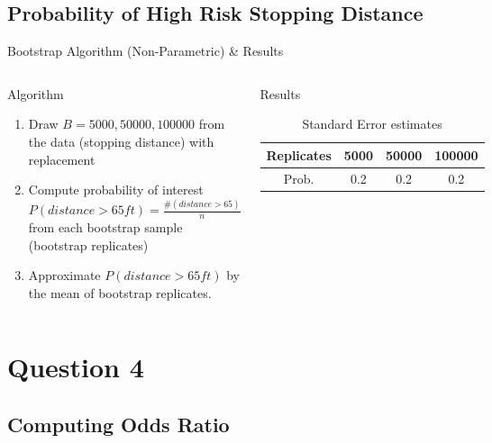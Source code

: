 \documentclass[a4paper,9pt]{beamer}\usepackage[]{graphicx}\usepackage[]{color}
\begin{document}
\subsection{Probability of High Risk Stopping Distance}
\begin{frame}{Bootstrap Algorithm (Non-Parametric) \& Results}

\begin{columns}
\begin{block}{Algorithm}
\begin{enumerate}[i]
 \item Draw $B=5000, 50000, 100000$ from the data (stopping distance) with replacement
 \item Compute probability of interest $P(distance > 65ft) = \frac{\#(distance > 65)}{n}$ from each bootstrap sample (bootstrap replicates)
 \item Approximate $P(distance > 65ft)$ by the mean of bootstrap replicates.
 \end{enumerate}
 \end{block}
 
 \begin{block}{Results}
 \begin{table}[h]
\begin{tabular}{cccc}
\hline
Replicates & 5000 & 50000 & 100000\\ 
\hline
Prob. & 0.2 & 0.2 & 0.2\\
\hline
\end{tabular}
\caption{Standard Error estimates}
\end{table}

 \end{block}
\end{columns}
\end{frame}


\section{Question 4}
\subsection{Computing Odds Ratio}
\end{document}
